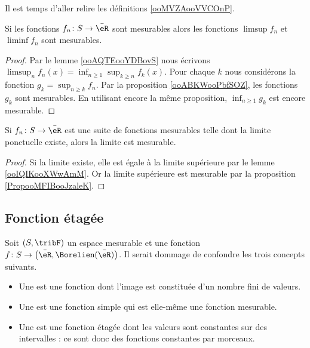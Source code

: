 Il est temps d'aller relire les définitions \ref{ooMVZAooVVCOnP}.

\begin{proposition}     \label{PropooMFIBooJzaleK}
    Si les fonctions \( f_n\colon S\to \bar \eR\) sont mesurables alors les fonctions \( \limsup f_n\) et \( \liminf f_n\) sont mesurables.
\end{proposition}

\begin{proof}
    Par le lemme \ref{ooAQTEooYDBovS} nous écrivons \( \limsup_nf_n(x)=\inf_{n\geq 1}\sup_{k\geq n} f_k(x)\). Pour chaque \( k\) nous considérons la fonction \( g_k=\sup_{n\geq k}f_n\). Par la proposition \ref{ooABKWooPbfSOZ}, les fonctions \( g_k\) sont mesurables. En utilisant encore la même proposition, \( \inf_{n\geq 1}g_k\) est encore mesurable.
\end{proof}

\begin{proposition}      \label{PropooDXBGooSFqrai}
    Si \( f_n\colon S\to \bar \eR\) est une suite de fonctions mesurables telle dont la limite ponctuelle existe, alors la limite est mesurable.
\end{proposition}

\begin{proof}
    Si la limite existe, elle est égale à la limite supérieure par le lemme \ref{ooIQIKooXWwAmM}. Or la limite supérieure est mesurable par la proposition \ref{PropooMFIBooJzaleK}.
\end{proof}

\subsection{Fonction étagée}

\begin{definition}\label{DefBPCxdel}
    Soit \( (S,\tribF)\) un espace mesurable et une fonction \( f\colon S\to \big( \bar\eR,\Borelien(\bar\eR) \big)\). Il serait dommage de confondre les trois concepts suivants.
    \begin{itemize}
        \item
    Une  est une fonction dont l'image est constituée d'un nombre fini de valeurs.
\item
    Une  est une fonction simple qui est elle-même une fonction mesurable.
\item
    Une  est une fonction étagée dont les valeurs sont constantes sur des intervalles : ce sont donc des fonctions constantes par morceaux.
    \end{itemize}
\end{definition}

